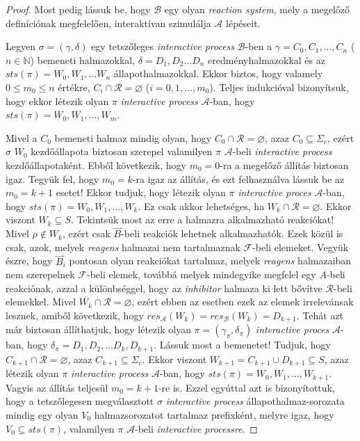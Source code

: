 \documentclass[12pt]{article}
\theoremstyle{definition}
\theoremstyle{remark}
\theoremstyle{plain}
\theoremstyle{plain}
\let\emptyset\varnothing
\newcommand{\forwardhat}{\overset{\rightharpoonup}}
\newcommand{\res}{\textit{res}}
\begin{document}
\begin{proof}
        Most pedig lássuk be, hogy $\mathscr{B}$ egy olyan \textit{reaction system}, mely a megelőző definíciónak megfelelően, interaktívan szimulálja $\mathscr{A}$ lépéseit.

        Legyen $\sigma = (\gamma, \delta)$ egy tetszőleges \textit{interactive process} $\mathscr{B}$-ben a $\gamma = C_{0}, C_{1}, \ldots, C_{n}$ ($n \in \mathbb{N}$) bemeneti halmazokkal, $\delta = D_{1}, D_{2} \ldots D_{n}$ eredményhalmazokkal és az $\textit{sts}(\pi)=W_{0},W_{1},\ldots W_{n}$ állapothalmazokkal. Ekkor biztos, hogy valamely $0 \leq m_{0} \leq n$ értékre, $C_{i} \cap \mathcal{R} = \emptyset$ ($i = 0, 1, \ldots, m_{0}$). Teljes indukcióval bizonyítsuk, hogy ekkor létezik olyan $\pi$ \textit{interactive process} $\mathscr{A}$-ban, hogy $\textit{sts}(\pi) = W_{0}, W_{1}, \ldots, W_{m}$.
        
        Mivel a $C_{0}$ bemeneti halmaz mindig olyan, hogy $C_{0} \cap \mathcal{R} = \emptyset$, azaz $C_{0} \subseteq \Sigma_{c}$, ezért $\sigma$ $W_{0}$ kezdőállapota biztosan szerepel valamilyen $\pi$ $\mathscr{A}$-beli \textit{interactive process} kezdőállapotaként. Ebből következik, hogy $m_{0} = 0$-ra a megelőző állítás biztosan igaz. Tegyük fel, hogy $m_{0} = k$-ra igaz az állítás, és ezt felhasználva lássuk be az $m_{0} = k + 1$ esetet! Ekkor tudjuk, hogy létezik olyan $\pi$ \textit{interactive proces} $\mathscr{A}$-ban, hogy $\textit{sts}(\pi) = W_{0}, W_{1}, \ldots, W_{k}$. Ez csak akkor lehetséges, ha $W_{k} \cap \mathcal{R} = \emptyset$. Ekkor viszont $W_{k} \subseteq S$. Tekintsük most az erre a halmazra alkalmazható reakciókat! Mivel $\rho \notin W_{k}$, ezért csak $\forwardhat B$-beli reakciók lehetnek alkalmazhatók. Ezek közül is csak, azok, melyek \textit{reagens} halmazai nem tartalmaznak $\mathcal{F}$-beli elemeket. Vegyük észre, hogy $\forwardhat B_{i}$ pontosan olyan reakciókat tartalmaz, melyek \textit{reagens} halmazaiban nem szerepelnek $\mathcal{F}$-beli elemek, továbbá melyek mindegyike megfelel egy $A$-beli reakciónak, azzal a különbséggel, hogy az \textit{inhibitor} halmaza ki lett bővítve $\mathcal{R}$-beli elemekkel. Mivel $W_{k} \cap \mathcal{R} = \emptyset$, ezért ebben az esetben ezek az elemek irrelevánsak lesznek, amiből következik, hogy $\res_{\mathscr{A}}(W_{k}) = \res_{\mathscr{B}}(W_{k}) = D_{k + 1}$. Tehát azt már biztosan állíthatjuk, hogy létezik olyan $\pi = (\gamma_{\pi}, \delta_{\pi})$ \textit{interactive proces} $\mathscr{A}$-ban, hogy $\delta_{\pi} = D_{1}, D_{2}, \ldots D_{k}, D_{k + 1}$. Lássuk most a bemenetet! Tudjuk, hogy $C_{k + 1} \cap \mathcal{R} = \emptyset$, azaz $C_{k + 1} \subseteq \Sigma_{c}$. Ekkor viszont $W_{k + 1} = C_{k + 1} \cup D_{k + 1} \subseteq S$, azaz létezik olyan $\pi$ \textit{interactive process} $\mathscr{A}$-ban, hogy $\textit{sts}(\pi)=W_{0}, W_{1}, \ldots, W_{k + 1}$. Vagyis az állítás teljesül $m_{0} = k + 1$-re is.  Ezzel egyúttal azt is bizonyítottuk, hogy a tetszőlegesen megválasztott $\sigma$ \textit{interactive process} állapothalmaz-sorozata mindig egy olyan $V_{0}$ halmazsorozatot tartalmaz prefixként, melyre igaz, hogy $V_{0} \subseteq \textit{sts}(\pi)$, valamilyen $\pi$ $\mathscr{A}$-beli \textit{interactive processre}.
        

\end{proof}
\end{document}
